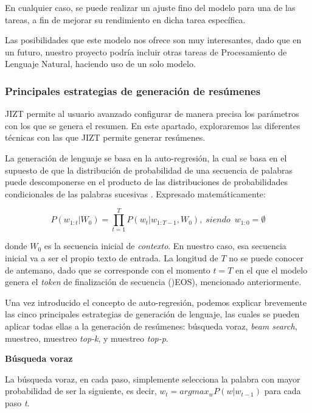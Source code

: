 
En cualquier caso, se puede realizar un ajuste fino del modelo para una de las tareas, a fin de mejorar su rendimiento en dicha tarea específica.

Las posibilidades que este modelo nos ofrece son muy interesantes, dado que en un futuro, nuestro proyecto podría incluir otras tareas de Procesamiento de Lenguaje Natural, haciendo uso de un solo modelo.


\bigskip
\subsubsection{Principales estrategias de generación de resúmenes}

JIZT permite al usuario avanzado configurar de manera precisa los parámetros con los que se genera el resumen. En este apartado, exploraremos las diferentes técnicas con las que JIZT permite generar resúmenes.

La generación de lenguaje se basa en la auto-regresión, la cual se basa en el supuesto de que la distribución de probabilidad de una secuencia de palabras puede descomponerse en el producto de las distribuciones de probabilidades  condicionales de las palabras sucesivas \cite{platen20}. Expresado matemáticamente:

\[ P(w_{1:t} | W_0) = \prod_{t=1}^{T} P(w_t | w_{1:T-1}, W_0), \; siendo \enspace w_{1:0} = \emptyset \]

donde $W_0$ es la secuencia inicial de \emph{contexto}. En nuestro caso, esa secuencia inicial va a ser el propio texto de entrada. La longitud de $T$ no se puede conocer de antemano, dado que se corresponde con el momento $t = T$ en el que el modelo genera el \emph{token} de finalización de secuencia ()EOS), mencionado anteriormente.

Una vez introducido el concepto de auto-regresión, podemos explicar brevemente las cinco	 principales estrategias de generación de lenguaje, las cuales se pueden aplicar todas ellas a la generación de resúmenes: búsqueda voraz, \emph{beam search}, muestreo, muestreo \emph{top-k}, y muestreo \emph{top-p}.

\bigskip
\noindent
\textbf{Búsqueda voraz}

La búsqueda voraz, en cada paso, simplemente selecciona la palabra con mayor probabilidad de ser la siguiente, es decir, $ w_t = argmax_w P(w|w_{t-1}) $ para cada paso \emph{t}.

